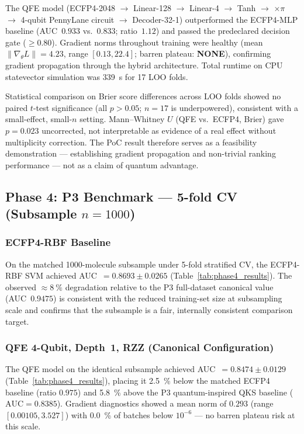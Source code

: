 The QFE model (ECFP4-2048 $\to$ Linear-128 $\to$ Linear-4 $\to$ Tanh $\to$
$\times\pi$ $\to$ 4-qubit PennyLane circuit $\to$ Decoder-32-1) outperformed
the ECFP4-MLP baseline (AUC~$0.933$ vs.\ $0.833$; ratio~$1.12$) and passed
the predeclared decision gate ($\geq 0.80$). Gradient norms throughout training
were healthy (mean $\|\nabla_\theta L\| = 4.23$, range $[0.13, 22.4]$; barren
plateau: \textbf{NONE}), confirming gradient propagation through the hybrid
architecture. Total runtime on CPU statevector simulation was \qty{339}{\second}
for 17 LOO folds.

Statistical comparison on Brier score differences across LOO folds showed no
paired $t$-test significance (all $p > 0.05$; $n = 17$ is underpowered),
consistent with a small-effect, small-$n$ setting. Mann--Whitney $U$
(QFE vs.\ ECFP4, Brier) gave $p = 0.023$ uncorrected, not interpretable
as evidence of a real effect without multiplicity correction. The PoC result
therefore serves as a feasibility demonstration — establishing gradient
propagation and non-trivial ranking performance — not as a claim of quantum
advantage.


\subsection{Phase 4: P3 Benchmark — 5-fold CV (Subsample $n = 1000$)}

\subsubsection{ECFP4-RBF Baseline}

On the matched \num{1000}-molecule subsample under 5-fold stratified CV,
the ECFP4-RBF SVM achieved AUC~$= 0.8693 \pm 0.0265$
(Table~\ref{tab:phase4_results}). The observed $\approx \qty{8}{\percent}$
degradation relative to the P3 full-dataset canonical value (AUC~$0.9475$)
is consistent with the reduced training-set size at subsampling scale and
confirms that the subsample is a fair, internally consistent comparison target.

\subsubsection{QFE 4-Qubit, Depth~1, RZZ (Canonical Configuration)}

The QFE model on the identical subsample achieved
AUC~$= 0.8474 \pm 0.0129$ (Table~\ref{tab:phase4_results}), placing it
\qty{2.5}{\percent} below the matched ECFP4 baseline (ratio $0.975$) and
\qty{5.8}{\percent} above the P3 quantum-inspired QKS baseline
($\text{AUC} = 0.8385$). Gradient diagnostics showed a mean norm of $0.293$
(range $[0.00105, 3.527]$) with \qty{0.0}{\percent} of batches below $10^{-6}$
— no barren plateau risk at this scale.

